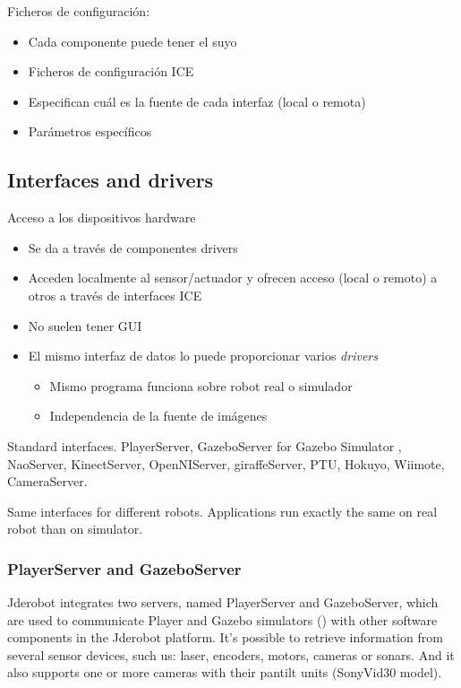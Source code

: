 \documentclass[twocolumn]{svjour3}          %
\begin{document}
Ficheros de configuración:
\begin{itemize}
\item Cada componente puede tener el suyo 
\item Ficheros de configuración ICE
\item Especifican cuál es la fuente de cada interfaz (local o remota)
\item Parámetros específicos
\end{itemize}

\subsection{Interfaces and drivers}


Acceso a los dispositivos hardware
\begin{itemize}
\item Se da a través de {componentes drivers}
\item Acceden localmente al sensor/actuador y ofrecen acceso (local o remoto) a otros a través de interfaces ICE
\item No suelen tener GUI
\item El mismo interfaz de datos lo puede proporcionar varios \textit{drivers}
\begin{itemize}
\item Mismo programa funciona sobre robot real o simulador
\item Independencia de la fuente de imágenes
\end{itemize}
\end{itemize}


Standard interfaces. 
PlayerServer, GazeboServer for Gazebo Simulator , NaoServer, KinectServer, OpenNIServer, giraffeServer, PTU, Hokuyo, Wiimote, CameraServer.

Same interfaces for different robots.
Applications run exactly the same on real robot than on simulator. 

\subsubsection{PlayerServer and GazeboServer}
\label{subsec:gazeboserver}

Jderobot integrates two servers, named PlayerServer and GazeboServer, which are used to communicate Player and Gazebo simulators (\cite{koening2004}) with other software components in the Jderobot platform. It's possible to retrieve information from several sensor devices, such us: laser, encoders, motors, cameras or sonars. And it also supports one or more cameras with their pantilt units (SonyVid30 model).
\end{document}
